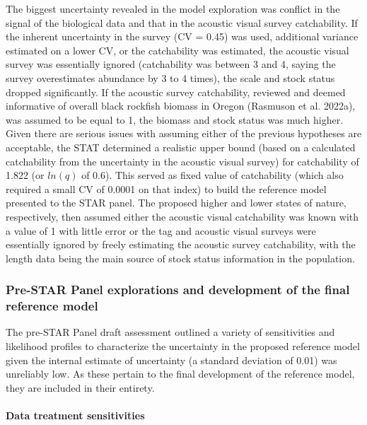 \documentclass[11pt,
  english,
  letterpaper,
]{article}
\begin{document}
The biggest uncertainty revealed in the model exploration was conflict in the signal of the biological data and that in the acoustic visual survey catchability. If the inherent uncertainty in the survey (CV = 0.45) was used, additional variance estimated on a lower CV, or the catchability was estimated, the acoustic visual survey was essentially ignored (catchability was between 3 and 4, saying the survey overestimates abundance by 3 to 4 times), the scale and stock status dropped significantly. If the acoustic survey catchability, reviewed and deemed informative of overall black rockfish biomass in Oregon (Rasmuson et al. 2022a), was assumed to be equal to 1, the biomass and stock status was much higher. Given there are serious issues with assuming either of the previous hypotheses are acceptable, the STAT determined a realistic upper bound (based on a calculated catchability from the uncertainty in the acoustic visual survey) for catchability of 1.822 (or \(ln(q)\) of 0.6). This served as fixed value of catchability (which also required a small CV of 0.0001 on that index) to build the reference model presented to the STAR panel. The proposed higher and lower states of nature, respectively, then assumed either the acoustic visual catchability was known with a value of 1 with little error or the tag and acoustic visual surveys were essentially ignored by freely estimating the acoustic survey catchability, with the length data being the main source of stock status information in the population.

\hypertarget{pre-star-panel-explorations-and-development-of-the-final-reference-model}{%
\subsubsection{Pre-STAR Panel explorations and development of the final reference model}\label{pre-star-panel-explorations-and-development-of-the-final-reference-model}}

The pre-STAR Panel draft assessment outlined a variety of sensitivities and likelihood profiles to characterize the uncertainty in the proposed reference model given the internal estimate of uncertainty (a standard deviation of 0.01) was unreliably low. As these pertain to the final development of the reference model, they are included in their entirety.

\hypertarget{data-treatment-sensitivities}{%
\paragraph{Data treatment sensitivities}\label{data-treatment-sensitivities}}
\end{document}
